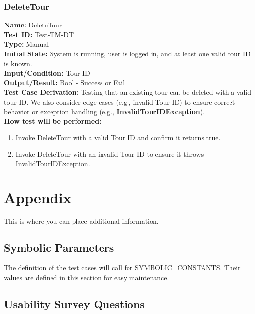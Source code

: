 \documentclass[12pt, titlepage]{article}
\begin{document}
\subsubsection{DeleteTour}
\textbf{Name:} DeleteTour \label{itm:Test-TM-DT} \\
\textbf{Test ID:} Test-TM-DT \\
\textbf{Type:} Manual \\
\textbf{Initial State:} System is running, user is logged in, and at least one valid tour ID is known. \\
\textbf{Input/Condition:} Tour ID \\
\textbf{Output/Result:} Bool - Success or Fail \\
\textbf{Test Case Derivation:} Testing that an existing tour can be deleted with a valid tour ID. We also consider edge cases (e.g., invalid Tour ID) to ensure correct behavior or exception handling (e.g., \textbf{InvalidTourIDException}).\\
\textbf{How test will be performed:}
\begin{enumerate}
    \item Invoke DeleteTour with a valid Tour ID and confirm it returns true.
    \item Invoke DeleteTour with an invalid Tour ID to ensure it throws InvalidTourIDException.
\end{enumerate}


\printbibliography



\newpage

\section{Appendix}

This is where you can place additional information.

\subsection{Symbolic Parameters}

The definition of the test cases will call for SYMBOLIC\_CONSTANTS.
Their values are defined in this section for easy maintenance.

\subsection{Usability Survey Questions} \label{sub:usability_survey}
\end{document}
